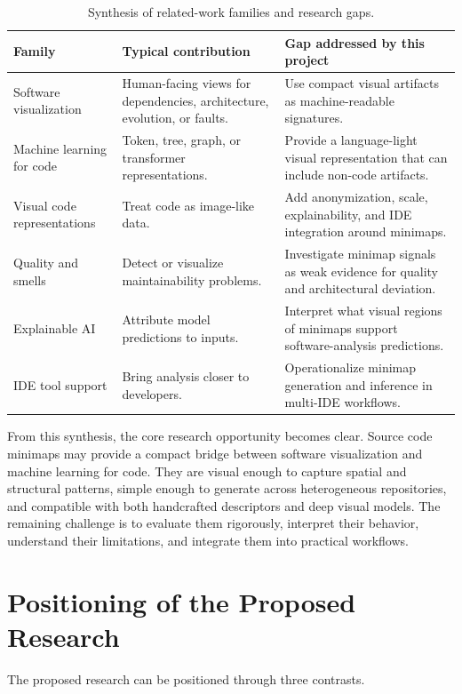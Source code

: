 \begin{table}[ht]
\centering
\caption{Synthesis of related-work families and research gaps.}
\label{tab:related-synthesis}
\begin{tabular}{p{}p{}p{}}
\toprule
\textbf{Family} & \textbf{Typical contribution} & \textbf{Gap addressed by this project} \\
\midrule
Software visualization & Human-facing views for dependencies, architecture, evolution, or faults. & Use compact visual artifacts as machine-readable signatures. \\
Machine learning for code & Token, tree, graph, or transformer representations. & Provide a language-light visual representation that can include non-code artifacts. \\
Visual code representations & Treat code as image-like data. & Add anonymization, scale, explainability, and IDE integration around minimaps. \\
Quality and smells & Detect or visualize maintainability problems. & Investigate minimap signals as weak evidence for quality and architectural deviation. \\
Explainable AI & Attribute model predictions to inputs. & Interpret what visual regions of minimaps support software-analysis predictions. \\
IDE tool support & Bring analysis closer to developers. & Operationalize minimap generation and inference in multi-IDE workflows. \\
\bottomrule
\end{tabular}
\fautor
\end{table}

From this synthesis, the core research opportunity becomes clear. Source code
minimaps may provide a compact bridge between software visualization and
machine learning for code. They are visual enough to capture spatial and
structural patterns, simple enough to generate across heterogeneous repositories,
and compatible with both handcrafted descriptors and deep visual models. The
remaining challenge is to evaluate them rigorously, interpret their behavior,
understand their limitations, and integrate them into practical workflows.

\section{Positioning of the Proposed Research}

The proposed research can be positioned through three contrasts.

